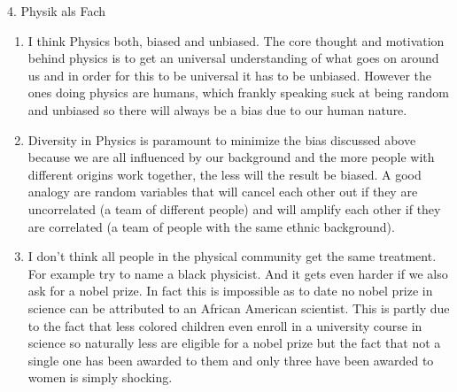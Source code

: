 \documentclass{alex_hü}
\begin{document}
\begin{mybox}{4. Physik als Fach}
	\begin{enumerate}
		\item I think Physics both, biased and unbiased. The core thought and motivation behind physics is to get an universal understanding of what goes on around us and in order for this to be universal it has to be unbiased. However the ones doing physics are humans, which frankly speaking suck at being random and unbiased so there will always be a bias due to our human nature. 
	\tcbline
		\item Diversity in Physics is paramount to minimize the bias discussed above because we are all influenced by our background and the more people with different origins work together, the less will the result be biased. A good analogy are random variables that will cancel each other out if they are uncorrelated (a team of different people) and will amplify each other if they are correlated (a team of people with the same ethnic background).
	\tcbline
		\item I don't think all people in the physical community get the same treatment. For example try to name a black physicist. And it gets even harder if we also ask for a nobel prize. In fact this is impossible as to date no nobel prize in science can be attributed to an African American scientist. This is partly due to the fact that less colored children even enroll in a university course in science so naturally less are eligible for a nobel prize but the fact that not a single one has been awarded to them and only three have been awarded to women is simply shocking. 
	\end{enumerate}
\end{mybox}
\end{document}
